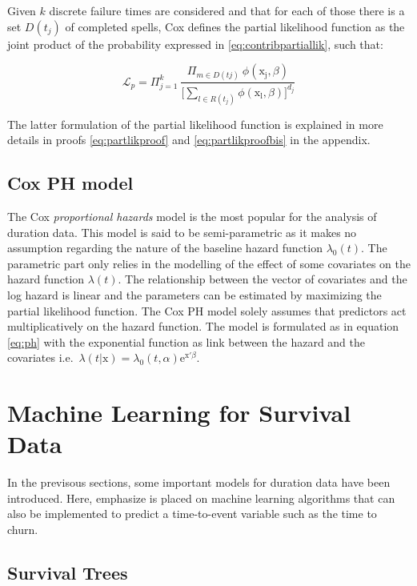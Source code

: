 \documentclass[
]{book}
\begin{document}
Given \(k\) discrete failure times are considered and that for each of those there is a set \(D(t_j)\) of completed spells, Cox defines the partial likelihood function as the joint product of the probability expressed in \eqref{eq:contribpartiallik}, such that:

\begin{equation}
  \mathcal{L}_p = \Pi_{j=1}^{k} \ \frac{\Pi_{m \in D(tj)} \ \phi(\mathrm{x_j}, \beta)}{\Big[\sum_{l \in R(t_j)} \phi(\mathrm{x_l}, \beta)\Big]^{d_j}}
  \label{eq:partlik}
\end{equation}

The latter formulation of the partial likelihood function is explained in more details in proofs \eqref{eq:partlikproof} and \eqref{eq:partlikproofbis} in the appendix.

\hypertarget{coxph}{%
\subsection{Cox PH model}\label{coxph}}

The Cox \emph{proportional hazards} model is the most popular for the analysis of duration data. This model is said to be semi-parametric as it makes no assumption regarding the nature of the baseline hazard function \(\lambda_0(t)\). The parametric part only relies in the modelling of the effect of some covariates on the hazard function \(\lambda(t)\). The relationship between the vector of covariates and the log hazard is linear and the parameters can be estimated by maximizing the partial likelihood function. The Cox PH model solely assumes that predictors act multiplicatively on the hazard function. The model is formulated as in equation \eqref{eq:ph} with the exponential function as link between the hazard and the covariates i.e.~\(\lambda(t|\pmb{\mathrm{x}}) = \lambda_0 (t,\alpha) \text{e}^{\pmb{\mathrm{x'}} \beta}\).

\hypertarget{mlsurv}{%
\section{Machine Learning for Survival Data}\label{mlsurv}}

In the previsous sections, some important models for duration data have been introduced. Here, emphasize is placed on machine learning algorithms that can also be implemented to predict a time-to-event variable such as the time to churn.

\hypertarget{survival-trees}{%
\subsection{Survival Trees}\label{survival-trees}}
\end{document}
